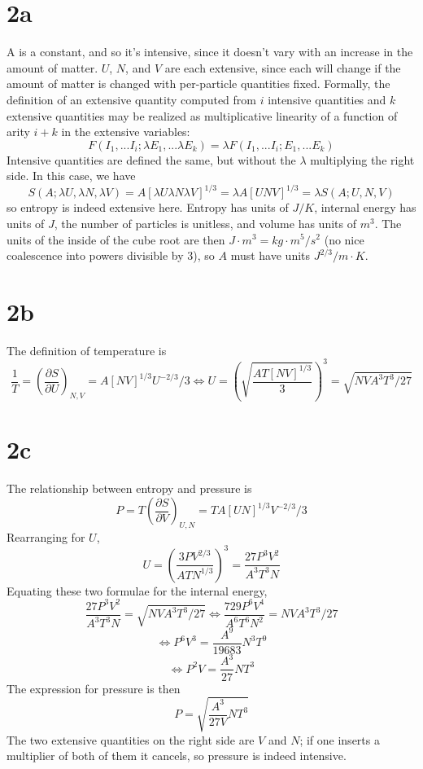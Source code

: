 \documentclass{article}
\begin{document}
\section*{2a}
A is a constant, and so it's intensive, since it doesn't vary with an increase in the amount of matter. $U$, $N$, and $V$ are each extensive, since each will change if the amount of matter is changed with per-particle quantities fixed.
Formally, the definition of an extensive quantity computed from $i$ intensive quantities and $k$ extensive quantities may be realized as multiplicative linearity of a function of arity $i+k$ in the extensive variables:
\[F(I_{1},...I_{i};\lambda E_{1},...\lambda E_{k})=\lambda F(I_{1},...I_{i};E_{1},...E_{k})\]
Intensive quantities are defined the same, but without the $\lambda$ multiplying the right side.
In this case, we have
\[S(A;\lambda U,\lambda N,\lambda V)=A[\lambda U\lambda N \lambda V]^{1/3}=\lambda A[UNV]^{1/3}=\lambda S(A;U,N,V)\]
so entropy is indeed extensive here.
Entropy has units of $\si{J/K}$, internal energy has units of $\si{J}$, the number of particles is unitless, and volume has units of $\si{m^{3}}$. The units of the inside of the cube root are then $\si{J\cdot m^{3}}=\si{kg \cdot m^{5}/s^{2}}$ (no nice coalescence into powers divisible by 3), so $A$ must have units $\si{J^{2/3}/m\cdot K}$.

\section*{2b}
The definition of temperature is
\[\frac{1}{T}=\left( \frac{\partial S}{\partial U} \right)_{N,V}=A[NV]^{1/3}U^{-2/3}/3\Leftrightarrow U=\left( \sqrt{\frac{AT[NV]^{1/3}}{3}}\right)^{3}=\sqrt{NVA^{3}T^{3}/27}\]

\section*{2c}
The relationship between entropy and pressure is
\[P=T\left( \frac{\partial S}{\partial V} \right)_{U,N}=TA[UN]^{1/3}V^{-2/3}/3\]
Rearranging for $U$,
\[U=\left( {\frac{3PV^{2/3}}{ATN^{1/3}}}\right)^{3}=\frac{27P^{3}V^{2}}{A^{3}T^{3}N}\]
Equating these two formulae for the internal energy,
\[\frac{27P^{3}V^{2}}{A^{3}T^{3}N}=\sqrt{NVA^{3}T^{3}/27}\Leftrightarrow \frac{729P^{6}V^{4}}{A^{6}T^{6}N^{2}}=NVA^{3}T^{3}/27\]
\[\Leftrightarrow P^{6}V^{3}=\frac{A^{9}}{19683}N^{3}T^{9}\]
\[\Leftrightarrow P^{2}V=\frac{A^{3}}{27}NT^{3}\]
The expression for pressure is then
\[P=\sqrt{\frac{A^{3}}{27V}NT^{3}}\]
The two extensive quantities on the right side are $V$ and $N$; if one inserts a multiplier of both of them it cancels, so pressure is indeed intensive.
\end{document}
